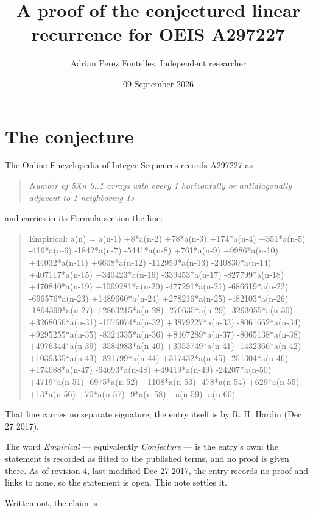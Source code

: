 \documentclass[11pt]{article}
\title{A proof of the conjectured linear recurrence for OEIS A297227}
\author{Adrian Perez Fontelles, Independent researcher}
\date{09 September 2026}
\theoremstyle{definition}
\begin{document}
\maketitle
\section{The conjecture}

The Online Encyclopedia of Integer Sequences records \href{https://oeis.org/A297227}{A297227} as

\begin{quote}\itshape Number of 5Xn 0..1 arrays with every 1 horizontally or antidiagonally adjacent to 1 neighboring 1s\end{quote}

and carries in its Formula section the line:

\begin{quote}\ttfamily Empirical: a(n) = a(n-1) +8*a(n-2) +78*a(n-3) +174*a(n-4) +351*a(n-5) -416*a(n-6) -1842*a(n-7) -5441*a(n-8) +761*a(n-9) +9986*a(n-10) +44032*a(n-11) +6608*a(n-12) -112959*a(n-13) -240830*a(n-14) +407117*a(n-15) +340423*a(n-16) -339453*a(n-17) -827799*a(n-18) +470840*a(n-19) +1069281*a(n-20) -477291*a(n-21) -686619*a(n-22) -696576*a(n-23) +1489660*a(n-24) +278216*a(n-25) -482103*a(n-26) -1864399*a(n-27) +2863215*a(n-28) -270635*a(n-29) -3293055*a(n-30) +3268056*a(n-31) -1576074*a(n-32) +3879227*a(n-33) -8061662*a(n-34) +9295255*a(n-35) -8324335*a(n-36) +8467289*a(n-37) -8065138*a(n-38) +4976344*a(n-39) -3584983*a(n-40) +3053749*a(n-41) -1432366*a(n-42) +1039335*a(n-43) -821799*a(n-44) +317432*a(n-45) -251304*a(n-46) +174088*a(n-47) -64693*a(n-48) +49419*a(n-49) -24207*a(n-50) +4719*a(n-51) -6975*a(n-52) +1108*a(n-53) -478*a(n-54) +629*a(n-55) +13*a(n-56) +70*a(n-57) -9*a(n-58) +a(n-59) -a(n-60)\end{quote}

That line carries no separate signature; the entry itself is by R. H. Hardin (Dec 27 2017).

The word {\itshape Empirical} --- equivalently {\itshape Conjecture} --- is the entry's own: the statement is recorded as fitted to the published terms, and no proof is given there. As of revision 4, last modified Dec 27 2017, the entry records no proof and links to none, so the statement is open. This note settles it.

Written out, the claim is
\end{document}
